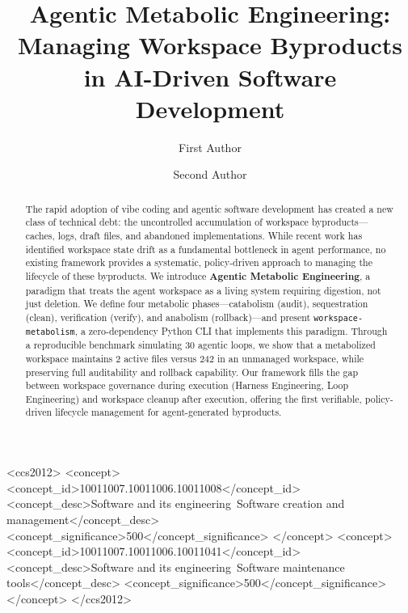 \documentclass[sigconf]{acmart}
\author{First Author}
\affiliation{%
  \institution{Your Institution}
  \city{Your City}
  \country{Your Country}}
\author{Second Author}
\affiliation{%
  \institution{Your Institution}
  \city{Your City}
  \country{Your Country}}
\begin{document}
\title{Agentic Metabolic Engineering: Managing Workspace Byproducts in AI-Driven Software Development}

\begin{abstract}
The rapid adoption of vibe coding and agentic software development has created a new class of technical debt: the uncontrolled accumulation of workspace byproducts---caches, logs, draft files, and abandoned implementations. While recent work has identified workspace state drift as a fundamental bottleneck in agent performance, no existing framework provides a systematic, policy-driven approach to managing the lifecycle of these byproducts. We introduce \textbf{Agentic Metabolic Engineering}, a paradigm that treats the agent workspace as a living system requiring digestion, not just deletion. We define four metabolic phases---catabolism (audit), sequestration (clean), verification (verify), and anabolism (rollback)---and present \texttt{workspace-metabolism}, a zero-dependency Python CLI that implements this paradigm. Through a reproducible benchmark simulating 30 agentic loops, we show that a metabolized workspace maintains 2 active files versus 242 in an unmanaged workspace, while preserving full auditability and rollback capability. Our framework fills the gap between workspace governance during execution (Harness Engineering, Loop Engineering) and workspace cleanup after execution, offering the first verifiable, policy-driven lifecycle management for agent-generated byproducts.
\end{abstract}

\begin{CCSXML}
<ccs2012>
<concept>
<concept_id>10011007.10011006.10011008</concept_id>
<concept_desc>Software and its engineering~Software creation and management</concept_desc>
<concept_significance>500</concept_significance>
</concept>
<concept>
<concept_id>10011007.10011006.10011041</concept_id>
<concept_desc>Software and its engineering~Software maintenance tools</concept_desc>
<concept_significance>500</concept_significance>
</concept>
</ccs2012>
\end{CCSXML}


\maketitle
\end{document}
